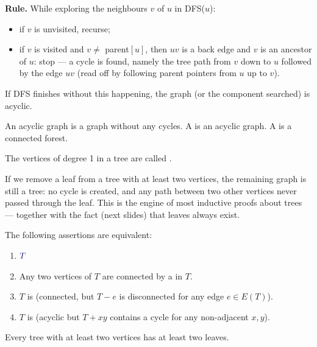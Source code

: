 \documentclass[8pt,a4paper,landscape]{extarticle}
\begin{document}
\begin{cscolumns}
\noindent\textbf{Rule.} While exploring the neighbours $v$ of $u$ in DFS($u$):
\begin{itemize}
\item if $v$ is unvisited, recurse;
\item if $v$ is visited and $v\ne$ parent$[u]$, then $uv$ is a back edge and $v$ is an ancestor of $u$: stop --- a cycle is found, namely the tree path from $v$ down to $u$ followed by the edge $uv$ (read off by following parent pointers from $u$ up to $v$).
\end{itemize}
If DFS finishes without this happening, the graph (or the component searched) is acyclic.


\begin{definition}
An acyclic graph is a graph without any cycles. A  is an acyclic graph. A  is a connected forest.
\end{definition}
\begin{definition}[Leaves]
The vertices of degree 1 in a tree are called .
\end{definition}
\begin{theorem}
If we remove a leaf from a tree with at least two vertices, the remaining graph is still a tree: no cycle is created, and any path between two other vertices never passed through the leaf. This is the engine of most inductive proofs about trees --- together with the fact (next slides) that leaves always exist.
\end{theorem}
\begin{theorem}
The following assertions are equivalent:
\begin{enumerate}[label=\arabic*.]
\item ${\color{csBlue}T}$ 
\item Any two vertices of $T$ are connected by a  in $T$.
\item $T$ is  (connected, but $T-e$ is disconnected for any edge $e\in E(T)$).
\item $T$ is  (acyclic but $T+xy$ contains a cycle for any non-adjacent $x,y$).
\end{enumerate}
\end{theorem}
\begin{theorem}[Lemma]
Every tree with at least two vertices has at least two leaves.
\end{theorem}
\begin{theorem}[Proposition]

\end{theorem}
\end{cscolumns}
\end{document}

